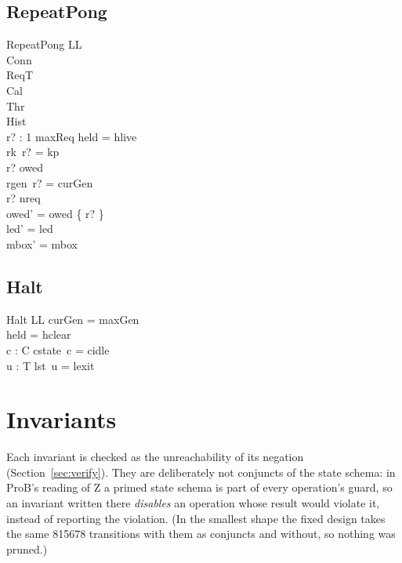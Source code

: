\documentclass[a4paper,10pt,fleqn]{article}
\begin{document}
\subsection{RepeatPong}

\begin{schema}{RepeatPong}
  \Delta LL \\
  \Xi Conn \\
  \Xi ReqT \\
  \Xi Cal \\
  \Xi Thr \\
  \Xi Hist \\
  r? : 1 \upto maxReq
\where
  held = hlive \\
  rk~r? = kp \\
  r? \notin owed \\
  rgen~r? = curGen \\
  r? \leq nreq \\
  owed' = owed \cup \{ r? \} \\
  led' = led \\
  mbox' = mbox
\end{schema}

\subsection{Halt}

\begin{schema}{Halt}
  \Xi LL
\where
  curGen = maxGen \\
  held = hclear \\
  \forall c : C \spot cstate~c = cidle \\
  \forall u : T \spot lst~u = lexit
\end{schema}



\section{Invariants}
\label{sec:inv}

Each invariant is checked as the unreachability of its negation
(Section~\ref{sec:verify}).  They are deliberately not conjuncts of the state
schema: in ProB's reading of Z a primed state schema is part of every
operation's guard, so an invariant written there \emph{disables} an operation
whose result would violate it, instead of reporting the violation.  (In the smallest
shape the fixed design takes the same 815678 transitions with them as conjuncts
and without, so nothing was pruned.)
\end{document}
